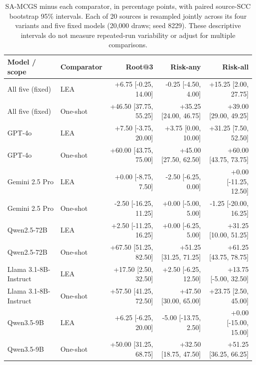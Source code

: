 \begin{table}[t]
\centering\small
\begin{tabular}{llrrr}
\toprule
Model / scope & Comparator & Root@3 & Risk-any & Risk-all \\
\midrule
All five (fixed) & LEA & +6.75 [-0.25, 14.00] & -0.25 [-4.50, 4.00] & +15.25 [2.00, 27.75] \\
All five (fixed) & One-shot & +46.50 [37.75, 55.25] & +35.25 [24.00, 46.75] & +39.00 [29.00, 49.25] \\
GPT-4o & LEA & +7.50 [-3.75, 20.00] & +3.75 [0.00, 10.00] & +31.25 [7.50, 52.50] \\
GPT-4o & One-shot & +60.00 [43.75, 75.00] & +45.00 [27.50, 62.50] & +60.00 [43.75, 73.75] \\
Gemini 2.5 Pro & LEA & +0.00 [-8.75, 7.50] & -2.50 [-6.25, 0.00] & +0.00 [-11.25, 12.50] \\
Gemini 2.5 Pro & One-shot & -2.50 [-16.25, 11.25] & +0.00 [-5.00, 5.00] & -1.25 [-20.00, 16.25] \\
Qwen2.5-72B & LEA & +2.50 [-11.25, 16.25] & +0.00 [-6.25, 5.00] & +31.25 [10.00, 51.25] \\
Qwen2.5-72B & One-shot & +67.50 [51.25, 82.50] & +51.25 [31.25, 71.25] & +61.25 [43.75, 78.75] \\
Llama 3.1-8B-Instruct & LEA & +17.50 [2.50, 32.50] & +2.50 [-6.25, 12.50] & +13.75 [-5.00, 32.50] \\
Llama 3.1-8B-Instruct & One-shot & +57.50 [41.25, 72.50] & +47.50 [30.00, 65.00] & +23.75 [2.50, 45.00] \\
Qwen3.5-9B & LEA & +6.25 [-6.25, 20.00] & -5.00 [-13.75, 2.50] & +0.00 [-15.00, 15.00] \\
Qwen3.5-9B & One-shot & +50.00 [31.25, 68.75] & +32.50 [18.75, 47.50] & +51.25 [36.25, 66.25] \\
\bottomrule\end{tabular}
\caption{SA-MCGS minus each comparator, in percentage points, with paired source-SCC bootstrap 95\% intervals. Each of 20 sources is resampled jointly across its four variants and five fixed models (20,000 draws; seed 8229). These descriptive intervals do not measure repeated-run variability or adjust for multiple comparisons.}
\label{tab:unified_paired_intervals}
\end{table}
